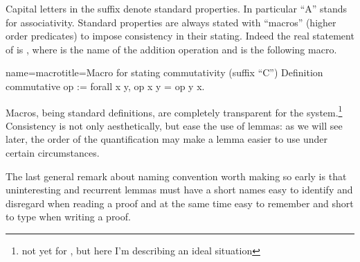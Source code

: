 




Capital letters in the suffix denote standard properties.
In particular ``A'' stands for associativity.  Standard properties are
always stated with ``macros'' (higher order predicates) to impose
consistency in their stating.  Indeed the real statement of
 is , where  is the
name of the addition operation and  is the
following macro.

\begin{coq}{name=macro}{title=Macro for stating commutativity (suffix ``C'')}
Definition commutative op := forall x y, op x y = op y x.
\end{coq}

Macros, being standard definitions, are completely transparent for the
system.\footnote{not yet for , but here I'm describing an ideal
situation}  Consistency is not only aesthetically, but ease the use of
lemmas: as we will see later, the order of the quantification may make
a lemma easier to use under certain circumstances.

The last general remark about naming convention worth making so early is that
uninteresting and recurrent lemmas must have a short names easy to identify and
disregard when reading a proof and at the same time easy to remember and short
to type when writing a proof.


